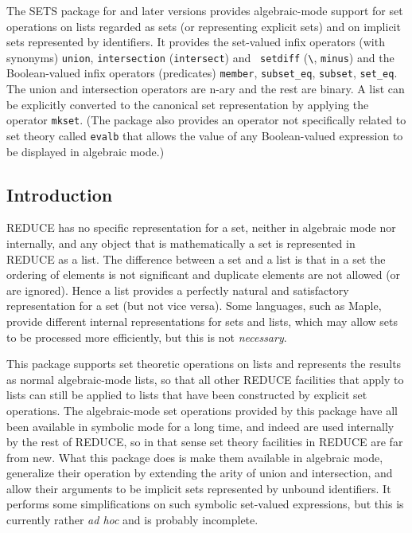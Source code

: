 

  The SETS package for  and later versions provides
  algebraic-mode support for set operations on lists regarded as sets
  (or representing explicit sets) and on implicit sets represented by
  identifiers.  It provides the set-valued infix operators (with
  synonyms) {\tt union}, {\tt intersection} ({\tt intersect}) and {\tt
  setdiff} (\verb|\|, {\tt minus}) and the Boolean-valued infix
  operators (predicates) {\tt member}, {\tt subset\_eq}, {\tt subset},
  {\tt set\_eq}.  The union and intersection operators are n-ary and
  the rest are binary.  A list can be explicitly converted to the
  canonical set representation by applying the operator {\tt mkset}.
  (The package also provides an operator not specifically related to
  set theory called {\tt evalb} that allows the value of any
  Boolean-valued expression to be displayed in algebraic mode.)


\subsection{Introduction}

REDUCE has no specific representation for a set, neither in algebraic
mode nor internally, and any object that is mathematically a set is
represented in REDUCE as a list.  The difference between a set and a
list is that in a set the ordering of elements is not significant and
duplicate elements are not allowed (or are ignored).  Hence a list
provides a perfectly natural and satisfactory representation for a set
(but not vice versa).  Some languages, such as Maple, provide
different internal representations for sets and lists, which may allow
sets to be processed more efficiently, but this is not \emph{necessary}.

This package supports set theoretic operations on lists and represents
the results as normal algebraic-mode lists, so that all other REDUCE
facilities that apply to lists can still be applied to lists that have
been constructed by explicit set operations.  The algebraic-mode set
operations provided by this package have all been available in
symbolic mode for a long time, and indeed are used internally by the
rest of REDUCE, so in that sense set theory facilities in REDUCE are
far from new.  What this package does is make them available in
algebraic mode, generalize their operation by extending the arity of
union and intersection, and allow their arguments to be implicit sets
represented by unbound identifiers.  It performs some simplifications
on such symbolic set-valued expressions, but this is currently rather
{\it ad hoc\/} and is probably incomplete.

